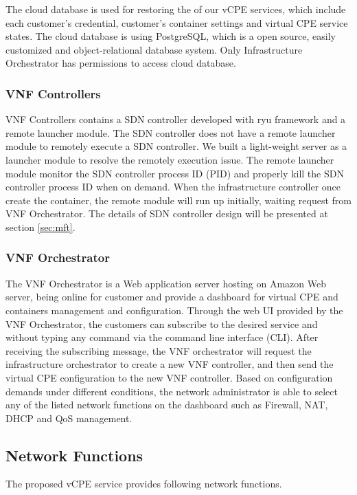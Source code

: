 \documentclass[journal]{IEEEtran}
\begin{document}
The cloud database is used for restoring the of our vCPE services, which include each customer’s credential, customer’s container settings and virtual CPE service states. The cloud database is using PostgreSQL, which is a open source, easily customized and object-relational database system. Only Infrastructure Orchestrator has permissions to access cloud database.

\subsubsection{VNF Controllers}

VNF Controllers contains a SDN controller developed with ryu framework\cite{web:ryu} and a remote launcher module. The SDN controller does not have a remote launcher module to remotely execute a SDN controller. We built a light-weight server as a launcher module to resolve the remotely execution issue. The remote launcher module monitor the SDN controller process ID (PID) and properly kill the SDN controller process ID when on demand. When the infrastructure controller once create the container, the remote module will run up initially, waiting request from VNF Orchestrator. The details of SDN controller design will be presented at section \ref{sec:mft}.

\subsubsection{VNF Orchestrator}

The VNF Orchestrator is a Web application server hosting on Amazon Web server, being online for customer and provide a dashboard for virtual CPE and containers management and configuration.
Through the web UI provided by the VNF Orchestrator, the customers can subscribe to the desired service and without typing any command via the command line interface (CLI). After receiving the subscribing message, the VNF orchestrator will request the infrastructure orchestrator to create a new VNF controller, and then send the virtual CPE configuration to the new VNF controller. Based on configuration demands under different conditions, the network administrator is able to select any of the listed network functions on the dashboard such as Firewall, NAT, DHCP and QoS management.



\subsection{Network Functions}
The proposed vCPE service provides following network functions.
\end{document}
